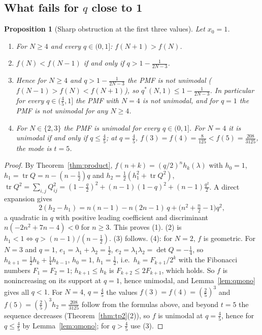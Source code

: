 \documentclass[11pt,a4paper]{article}
\newtheorem{proposition}[theorem]{Proposition}
\theoremstyle{definition}
\theoremstyle{remark}
\begin{document}
\subsection{What fails for \texorpdfstring{$q$}{q} close to 1}

\begin{proposition}[Sharp obstruction at the first three values]\label{prop:fail}
Let $x_0=1$.
\begin{enumerate}
\item For $N\ge4$ and every $q\in(0,1]$: $f(N+1)>f(N)$.
\item $f(N)<f(N-1)$ if and only if $q>1-\frac1{2N-3}$.
\item Hence for $N\ge4$ and $q>1-\frac{1}{2N-3}$ the PMF is not unimodal
($f(N-1)>f(N)<f(N+1)$), so $q^*(N,1)\le1-\frac1{2N-3}$. In particular for every $q\in(\frac45,1]$ the PMF
with $N=4$ is not unimodal, and for $q=1$ the PMF is not unimodal for any $N\ge4$.
\item For $N\in\{2,3\}$ the PMF is unimodal for every $q\in(0,1]$. For $N=4$ it is unimodal if and only if
$q\le\frac45$; at $q=\frac45$, $f(3)=f(4)=\frac{8}{125}<f(5)=\frac{208}{3125}$, the mode is $t=5$.
\end{enumerate}
\end{proposition}
\begin{proof}
By Theorem~\ref{thm:product}, $f(n+k)=(q/2)^nh_k(\lambda)$ with $h_0=1$,
$h_1=\operatorname{tr}Q=n-(n-\frac12)q$ and $h_2=\frac12(h_1^2+\operatorname{tr}Q^2)$,
$\operatorname{tr}Q^2=\sum_{i,j}Q_{ij}^2=(1-\frac q2)^2+(n-1)(1-q)^2+(n-1)\frac{q^2}2$. A direct expansion gives
\[
  2(h_2-h_1)=n(n-1)-n(2n-1)\,q+\bigl(n^2+\tfrac n2-1\bigr)q^2 ,
\]
a quadratic in $q$ with positive leading coefficient and discriminant $n(-2n^2+7n-4)<0$ for $n\ge3$. This proves
(1). (2) is $h_1<1\iff q>(n-1)/(n-\frac12)$. (3) follows. (4): for $N=2$, $f$ is geometric. For $N=3$ and $q=1$,
$e_1=\lambda_1+\lambda_2=\frac12$, $e_2=\lambda_1\lambda_2=\det Q=-\frac14$, so $h_{k+1}=\frac12h_k+\frac14h_{k-1}$,
$h_0=1$, $h_1=\frac12$, i.e.\ $h_k=F_{k+1}/2^k$ with the Fibonacci numbers $F_1=F_2=1$; $h_{k+1}\le h_k$ is
$F_{k+2}\le2F_{k+1}$, which holds. So $f$ is nonincreasing on its support at $q=1$, hence unimodal, and
Lemma~\ref{lem:qmono} gives all $q<1$. For $N=4$, $q=\frac45$ the values $f(3)=f(4)=(\frac25)^3$ and $f(5)=(\frac25)^3h_2=\frac{208}{3125}$ follow from the
formulas above, and beyond $t=5$ the sequence decreases (Theorem~\ref{thm:tp2}(2)), so $f$ is
unimodal at $q=\frac45$, hence for $q\le\frac45$ by Lemma~\ref{lem:qmono}; for $q>\frac45$ use (3).
\end{proof}
\end{document}
